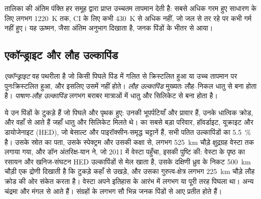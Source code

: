 तालिका की अंतिम पंक्ति हर समूह द्वारा प्राप्त उच्चतम तापमान देती है:
सबसे अधिक गरम हुए साधारण  के लिए लगभग \qty{1220}{K} तक, CI  के लिए
कभी \qty{430}{K} से अधिक नहीं, जो जल से तर रहे पर कभी गर्म नहीं हुए। यह
ऊष्मन, जैसा अंतिम अनुभाग दिखाता है, जनक पिंडों के भीतर से आया।

\subsection{एकॉन्ड्राइट और लौह उल्कापिंड}

\begin{definition}[एकॉन्ड्राइट, लौह उल्कापिंड, पाषाण-लौह उल्कापिंड]
\label{def:b2:planet-formation-meteorites:classes}
\emph{एकॉन्ड्राइट} वह पथरीला  है जो किसी पिघले पिंड में
गलित से क्रिस्टलित हुआ या उच्च तापमान पर पुनःक्रिस्टलित हुआ, और
इसलिए उसमें  नहीं होते। \emph{लौह उल्कापिंड}
मुख्यतः लौह--निकल धातु से बना होता है। \emph{पाषाण-लौह
उल्कापिंड} लगभग बराबर मात्राओं में धातु और सिलिकेट से
बना होता है।
\end{definition}

ये उन पिंडों के टुकड़े हैं जो पिघले और पृथक हुए:  उनकी
भूपर्पटियाँ और प्रावार हैं,  उनके धात्विक क्रोड, और  वहाँ से आते हैं जहाँ
धातु और सिलिकेट मिलते थे।  का सबसे बड़ा परिवार, हॉवर्डाइट,
यूक्राइट और डायोजेनाइट (HED), जो बेसाल्ट और पाइरॉक्सीन-समृद्ध चट्टानें हैं, सभी पतित
उल्कापिंडों का \qty{5.5}{\percent} है। उसके स्रोत का पता, उसके स्पेक्ट्रम और
उसकी कक्षा से, लगभग \qty{525}{km} चौड़े क्षुद्रग्रह वेस्टा तक लगाया गया, और डॉन
अंतरिक्ष-यान ने, जो 2011 में वेस्टा पहुँचा, इसकी पुष्टि की: वेस्टा के पृष्ठ का रसायन
और खनिज-संघटन HED उल्कापिंडों से मेल खाता है, उसके दक्षिणी ध्रुव के निकट
\qty{500}{km} चौड़ी एक द्रोणी दिखाती है कि टुकड़े कहाँ से उखड़े,
और उसका गुरुत्व-क्षेत्र लगभग \qty{225}{km} चौड़े लौह क्रोड की ओर संकेत करता है।
वेस्टा अपने इतिहास के आरंभ में लगभग या पूरी तरह पिघला था। अन्य 
चंद्रमा और मंगल से आते हैं। संग्रहों के  लगभग सौ भिन्न
जनक पिंडों से आए प्रतीत होते हैं।

